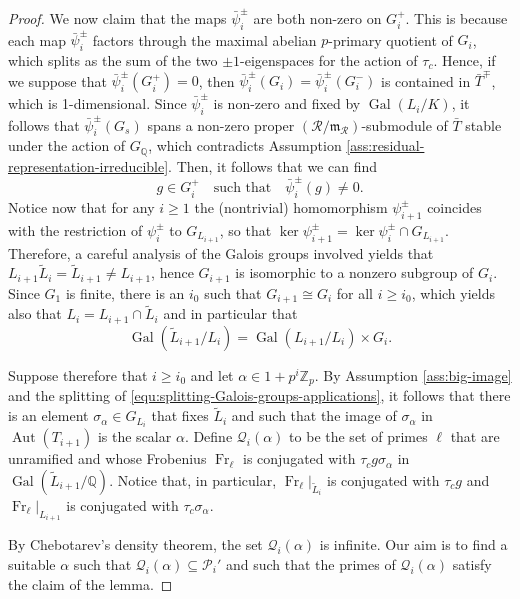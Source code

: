 \documentclass[12pt,reqno]{amsart}
\theoremstyle{definition}
\theoremstyle{remark}
\newcommand{\numberset}{\mathbb}
\newcommand{\Q}{\numberset{Q}}
\newcommand{\calR}{\mathcal{R}}
\DeclareMathOperator{\Gal}{Gal}
\DeclareMathOperator{\Aut}{Aut}
\DeclareMathOperator{\Fr}{Fr}
\newcommand{\ga}{\alpha}
\newcommand{\gs}{\sigma}
\newcommand{\Zp}{\numberset{Z}_p}
\newcommand{\m}{\mathfrak{m}}
\begin{document}
\begin{proof}
     We now claim that the maps $\bar{\psi}_i^\pm$ are both non-zero on $G_i^+$. This is because each map $\bar{\psi}_i^\pm$ factors through the maximal abelian $p$-primary quotient of $G_i$, which splits as the sum of the two $\pm 1$-eigenspaces for the action of $\tau_c$. 
    Hence, if we suppose that $\bar{\psi}_i^\pm(G_i^+)=0$, then $\bar{\psi}_i^\pm(G_i)=\bar{\psi}_i^\pm(G_i^-)$ is contained in $\bar{T}^\mp$, which is 1-dimensional. Since $\bar{\psi}_i^\pm$ is non-zero and fixed by $\Gal(L_i/K)$, it follows that $\bar{\psi}_i^\pm(G_s)$ spans a non-zero proper $(\calR/\m_\calR)$-submodule of $\bar{T}$ stable under the action of $G_\Q$, which contradicts Assumption \ref{ass:residual-representation-irreducible}. Then, it follows that we can find
    \begin{equation*}
        g\in G_i^+\quad\text{such that}\quad \bar{\psi}_i^\pm(g)\ne 0.
    \end{equation*}
     Notice now that for any $i\ge1$ the (nontrivial) homomorphism $\psi_{i+1}^{\pm}$ coincides with the restriction of $\psi_i^\pm$ to $G_{L_{i+1}}$, so that $\ker \psi_{i+1}^\pm=\ker \psi_i^\pm\cap G_{L_{i+1}}$. Therefore, a careful analysis of the Galois groups involved yields that $L_{i+1}\tilde{L}_i= \tilde{L}_{i+1}\ne L_{i+1}$, hence $G_{i+1}$ is isomorphic to a nonzero subgroup of $G_i$. Since $G_1$ is finite, there is an $i_0$ such that $G_{i+1}\cong G_i$ for all $i\ge i_0$, which yields also that $L_i=L_{i+1}\cap \tilde{L}_i$ and in particular that
    \begin{equation}\label{equ:splitting-Galois-groups-applications}
        \Gal(\tilde{L}_{i+1}/L_i)=\Gal(L_{i+1}/L_i)\times G_i.
    \end{equation}

    Suppose therefore that $i\ge i_0$ and let $\ga\in 1+p^i\Zp$. By Assumption \ref{ass:big-image} and the splitting of \eqref{equ:splitting-Galois-groups-applications}, it follows that there is an element $\gs_\ga\in G_{L_i}$ that fixes $\tilde{L}_i$ and such that the image of $\gs_\ga$ in $\Aut(T_{i+1})$ is the scalar $\ga$. Define $\mathcal{Q}_i(\ga)$ to be the set of primes $\ell$ that are unramified and whose Frobenius $\Fr_\ell$ is conjugated with $\tau_c g \gs_\ga$ in $\Gal(\tilde{L}_{i+1}/\Q)$. Notice that, in particular, $\Fr_\ell|_{\tilde{L}_i}$ is conjugated with $\tau_c g$ and $\Fr_\ell|_{L_{i+1}}$ is conjugated with $\tau_c \sigma_{\alpha}$.

     By Chebotarev's density theorem, the set $\mathcal{Q}_i(\ga)$ is infinite. Our aim is to find a suitable $\ga$ such that $\mathcal{Q}_i(\ga)\subseteq\mathcal{P}_i'$ and such that the primes of $\mathcal{Q}_i(\ga)$ satisfy the claim of the lemma.
    

\end{proof}
\end{document}
